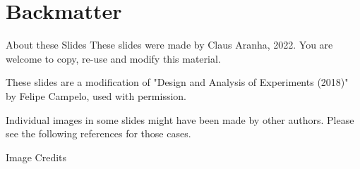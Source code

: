 \section{Backmatter}
\begin{frame}{About these Slides}
  These slides were made by Claus Aranha, 2022. You are welcome to copy, re-use and modify this material.
  \bigskip

  These slides are a modification of "Design and Analysis of Experiments (2018)" by Felipe Campelo, used with permission.
  \bigskip

  Individual images in some slides might have been made by other
  authors. Please see the following references for those cases.
\end{frame}

\begin{frame}[allowframebreaks]{Image Credits}
  \printnotes
\end{frame}
